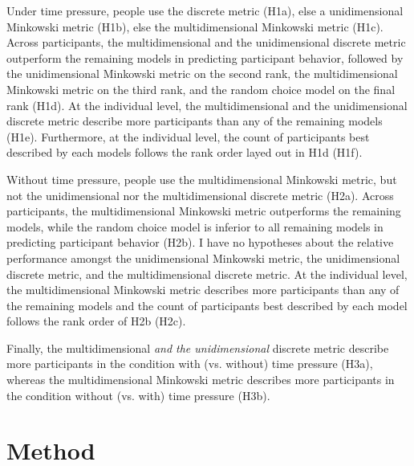 \documentclass[a4paper,man,natbib]{apa6}
\begin{document}
Under time pressure, people use the discrete metric (H1a), else a unidimensional Minkowski metric (H1b), else the multidimensional Minkowski metric (H1c). Across participants, the multidimensional and the unidimensional discrete metric outperform the remaining models in predicting participant behavior, followed by the unidimensional Minkowski metric on the second rank, the multidimensional Minkowski metric on the third rank, and the random choice model on the final rank (H1d). At the individual level, the multidimensional and the unidimensional discrete metric describe more participants than any of the remaining models (H1e). Furthermore, at the individual level, the count of participants best described by each models follows the rank order layed out in H1d (H1f). 

Without time pressure, people use the multidimensional Minkowski metric, but not the unidimensional nor the multidimensional discrete metric (H2a). Across participants, the multidimensional Minkowski metric outperforms the remaining models, while the random choice model is inferior to all remaining models in predicting participant behavior (H2b). I have no hypotheses about the relative performance amongst the unidimensional Minkowski metric, the unidimensional discrete metric, and the multidimensional discrete metric. At the individual level, the multidimensional Minkowski metric describes more participants than any of the remaining models and the count of participants best described by each model follows the rank order of H2b (H2c). 

Finally, the multidimensional \textit{and the unidimensional} discrete metric describe more participants in the condition with (vs. without) time pressure (H3a), whereas the multidimensional Minkowski metric describes more participants in the condition without (vs. with) time pressure (H3b).

\section{Method}
\end{document}
